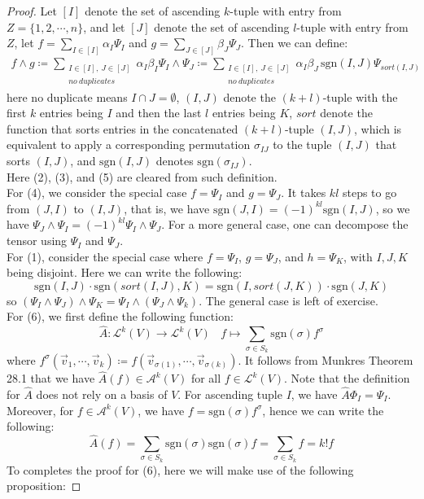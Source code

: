 \documentclass[11pt,oneside]{book}
\theoremstyle{break}
\theoremstyle{break}
\newcommand{\Lt}{\mathcal{L}}
\newcommand{\A}{\mathcal{A}}
\newcommand{\sgn}{\text{sgn}}
\begin{document}
\begin{proof}
Let $[I]$ denote the set of ascending $k$-tuple with entry from $Z = \{1,2,\cdots,n \}$, and let $[J]$ denote the set of ascending $l$-tuple with entry from $Z$, let $f = \sum_{I \in [I]} \alpha_I \Psi_I$ and $g = \sum_{J\in [J]}\beta_J \Psi_J$. Then we can define:
\begin{align*}
f \wedge g \coloneqq \sum\limits_{\substack{I\in [I], \ J\in [J]\\ no \ duplicates}} \alpha_I \beta_I \Psi_I \wedge \Psi_J \coloneqq \sum\limits_{\substack{I\in [I], \ J\in [J]\\ no \ duplicates}} \alpha_I  \beta_J \, \text{sgn}(I,J) \Psi_{sort(I,J)}
\end{align*}
here no duplicate means $I\cap J = \emptyset$, $(I,J)$ denote the $(k+l)$-tuple with the first $k$ entries being $I$ and then the last $l$ entries being $K$, $sort$ denote the function that sorts entries in the concatenated $(k+l)$-tuple $(I,J)$, which is equivalent to apply a corresponding permutation $\sigma_{IJ}$ to the tuple $(I,J)$ that sorts $(I,J)$, and $\text{sgn}(I,J)$ denotes $\sgn(\sigma_{IJ})$.\\ 

Here (2), (3), and (5) are cleared from such definition. \\

For (4), we consider the special case $f = \Psi_I$ and $g = \Psi_J$. It takes $kl$ steps to go from $(J,I)$ to $(I,J)$, that is, we have $\text{sgn}(J,I) = (-1)^{kl}\text{sgn}(I,J)$, so we have $\Psi_J \wedge \Psi_I  = (-1)^{kl}\Psi_I \wedge \Psi_J$. For a more general case, one can decompose the tensor using $\Psi_I$ and $\Psi_J$. \\

For (1), consider the special case where $f = \Psi_I$, $g = \Psi_J$, and $h = \Psi_K$, with $I,J,K$ being disjoint. Here we can write the following:
$$\text{sgn}(I,J)\cdot \text{sgn}(sort(I,J),K) = \text{sgn}(I, sort(J,K))\cdot \text{sgn}(J,K)$$ 
so $(\Psi_I \wedge \Psi_J) \wedge \Psi_K = \Psi_I \wedge (\Psi_J \wedge \Psi_k)$. The general case is left of exercise. \\

For (6), we first define the following function: 
$$\hat{A}: \Lt^k(V) \to \Lt^k(V) \ \ \ \ f\mapsto \sum_{\sigma \in S_k}\text{sgn}(\sigma) f^{\sigma}$$
where $f^\sigma(\vec{v}_1,\cdots, \vec{v}_k) \coloneqq f(\vec{v}_{\sigma(1)}, \cdots, \vec{v}_{\sigma(k)})$. It follows from Munkres Theorem 28.1 that we have $\hat{A}(f) \in \A^k(V)$ for all $f\in \Lt^k(V)$. Note that the definition for $\hat{A}$ does not rely on a basis of $V$. For ascending tuple $I$, we have $\hat{A}\Phi_{I} = \Psi_I$. Moreover, for $f \in \A^k(V)$, we have $f = \sgn(\sigma)f^\sigma$, hence we can write the following:
$$\hat{A}(f) =\sum_{\sigma \in S_k}\sgn(\sigma)\sgn(\sigma)f = \sum_{\sigma \in S_k} f = k! f$$
To completes the proof for (6), here we will make use of the following proposition:


\end{proof}
\end{document}
